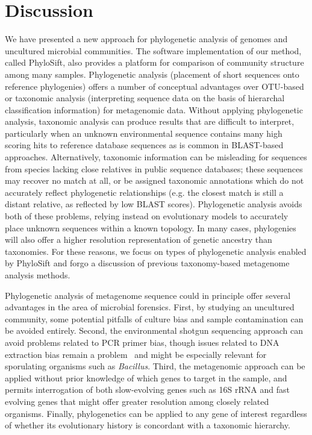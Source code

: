 \documentclass[10pt]{article}
\begin{document}
\section*{Discussion}
We have presented a new approach for phylogenetic analysis of genomes and uncultured microbial communities.
The software implementation of our method, called PhyloSift, also provides a platform for comparison of community structure among many samples.
Phylogenetic analysis (placement of short sequences onto reference phylogenies) offers a number of conceptual advantages over OTU-based or taxonomic analysis (interpreting sequence data on the basis of hierarchal classification information) for metagenomic data.
Without applying phylogenetic analysis, taxonomic analysis can produce results that are difficult to interpret, particularly when an unknown environmental sequence contains many high scoring hits to reference database sequences as is common in BLAST-based approaches.
Alternatively, taxonomic information can be misleading for sequences from species lacking close relatives in public sequence databases; these sequences may recover no match at all, or be assigned taxonomic annotations which do not accurately reflect phylogenetic relationships (e.g. the closest match is still a distant relative, as reflected by low BLAST scores).
Phylogenetic analysis avoids both of these problems, relying instead on evolutionary models to accurately place unknown sequences within a known topology.
In many cases, phylogenies will also offer a higher resolution representation of genetic ancestry than taxonomies. For these reasons, we focus on types of phylogenetic analysis enabled by PhyloSift and forgo a discussion of previous taxonomy-based metagenome analysis methods.


Phylogenetic analysis of metagenome sequence could in principle offer several advantages in the area of microbial forensics.
First, by studying an uncultured community, some potential pitfalls of culture bias and sample contamination can be avoided entirely.
Second, the environmental shotgun sequencing approach can avoid problems related to PCR primer bias, though issues related to DNA extraction bias remain a problem~\cite{Morgan2010} and might be especially relevant for sporulating organisms such as \textit{Bacillus}.
Third, the metagenomic approach can be applied without prior knowledge of which genes to target in the sample, and permits interrogation of both slow-evolving genes such as 16S rRNA and fast evolving genes that might offer greater resolution among closely related organisms.
Finally, phylogenetics can be applied to any gene of interest regardless of whether its evolutionary history is concordant with a taxonomic hierarchy.
\end{document}
